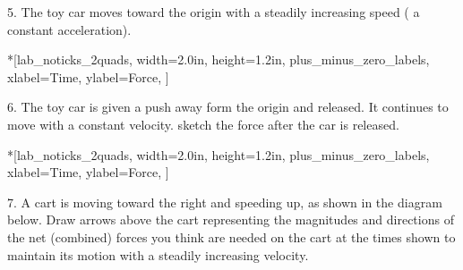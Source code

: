 5. The toy car moves toward the origin with a steadily increasing speed ( a
constant acceleration).

\begin{lab_axis}*[lab_noticks_2quads,
	width=2.0in,  height=1.2in,
	plus_minus_zero_labels,
	xlabel=Time,
	ylabel=Force,
	]
\end{lab_axis}

6. The toy car is given a push away form the origin and released. It continues
to move with a constant velocity. sketch the force after the car is released.

\begin{lab_axis}*[lab_noticks_2quads,
	width=2.0in,  height=1.2in,
	plus_minus_zero_labels,
	xlabel=Time,
	ylabel=Force,
	]
\end{lab_axis}

7. A cart is moving toward the right and speeding up, as shown in the diagram
below. Draw arrows above the cart representing the magnitudes and directions
of the net (combined) forces you think are needed on the cart at the times shown
to maintain its motion with a steadily increasing velocity.

